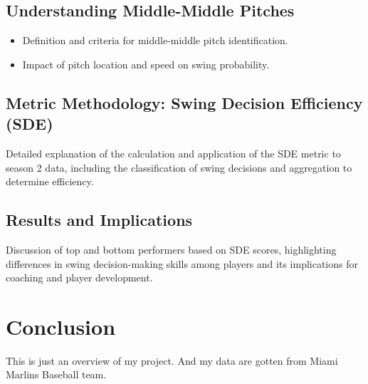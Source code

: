 \documentclass{article}
\begin{document}
\subsection*{Understanding Middle-Middle Pitches}
\begin{itemize}
    \item Definition and criteria for middle-middle pitch identification.
    \item Impact of pitch location and speed on swing probability.
\end{itemize}

\subsection*{Metric Methodology: Swing Decision Efficiency (SDE)}
Detailed explanation of the calculation and application of the SDE metric to season 2 data, including the classification of swing decisions and aggregation to determine efficiency.

\subsection*{Results and Implications}
Discussion of top and bottom performers based on SDE scores, highlighting differences in swing decision-making skills among players and its implications for coaching and player development.

\section*{Conclusion}
This is just an overview of my project. And my data are gotten from Miami Marlins Baseball team.
\end{document}
